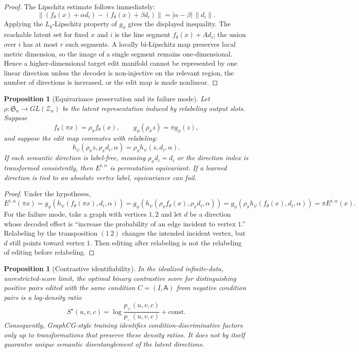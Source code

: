 \documentclass[11pt]{article}
\newtheorem{proposition}[theorem]{Proposition}
\newcommand{\Sn}{\mathfrak{S}_n}
\newcommand{\cZ}{\mathcal{Z}}
\begin{document}
\begin{proof}
The Lipschitz estimate follows immediately:
\[
  \| (f_\theta(x)+\alpha d_i)-(f_\theta(x)+\beta d_i)\|
  =
  |\alpha-\beta|\,\|d_i\|.
\]
Applying the $L_g$-Lipschitz property of $g_\phi$ gives the displayed inequality.  The reachable latent set for fixed $x$ and $i$ is the line segment $f_\theta(x)+A d_i$; the union over $i$ has at most $r$ such segments.  A locally bi-Lipschitz map preserves local metric dimension, so the image of a single segment remains one-dimensional.  Hence a higher-dimensional target edit manifold cannot be represented by one linear direction unless the decoder is non-injective on the relevant region, the number of directions is increased, or the edit map is made nonlinear.
\end{proof}

\begin{proposition}[Equivariance preservation and its failure mode]
\label{prop:graphcg-equivariance}
Let $\rho:\Sn\to GL(\cZ_n)$ be the latent representation induced by relabeling output slots.  Suppose
\[
  f_\theta(\pi x)=\rho_\pi f_\theta(x),\qquad
  g_\phi(\rho_\pi z)=\pi g_\phi(z),
\]
and suppose the edit map commutes with relabeling:
\[
  h_\psi(\rho_\pi z,\rho_\pi d_i,\alpha)
  =
  \rho_\pi h_\psi(z,d_i,\alpha).
\]
If each semantic direction is label-free, meaning $\rho_\pi d_i=d_i$ or the direction index is transformed consistently, then $E^{i,\alpha}$ is permutation equivariant.  If a learned direction is tied to an absolute vertex label, equivariance can fail.
\end{proposition}

\begin{proof}
Under the hypotheses,
\[
  E^{i,\alpha}(\pi x)
  =
  g_\phi\!\left(h_\psi(f_\theta(\pi x),d_i,\alpha)\right)
  =
  g_\phi\!\left(h_\psi(\rho_\pi f_\theta(x),\rho_\pi d_i,\alpha)\right)
  =
  g_\phi\!\left(\rho_\pi h_\psi(f_\theta(x),d_i,\alpha)\right)
  =
  \pi E^{i,\alpha}(x).
\]
For the failure mode, take a graph with vertices $1,2$ and let $d$ be a direction whose decoded effect is ``increase the probability of an edge incident to vertex $1$.''  Relabeling by the transposition $(1\ 2)$ changes the intended incident vertex, but $d$ still points toward vertex $1$.  Then editing after relabeling is not the relabeling of editing before relabeling.
\end{proof}

\begin{proposition}[Contrastive identifiability]
\label{prop:graphcg-identifiability}
In the idealized infinite-data, unrestricted-score limit, the optimal binary contrastive score for distinguishing positive pairs edited with the same condition $C=(I,\mathsf A)$ from negative condition pairs is a log-density ratio
\[
  S^\star(u,v,c)
  =
  \log\frac{p_{+}(u,v,c)}{p_{-}(u,v,c)}+\mathrm{const}.
\]
Consequently, GraphCG-style training identifies condition-discriminative factors only up to transformations that preserve these density ratios.  It does not by itself guarantee unique semantic disentanglement of the latent directions.
\end{proposition}
\end{document}

